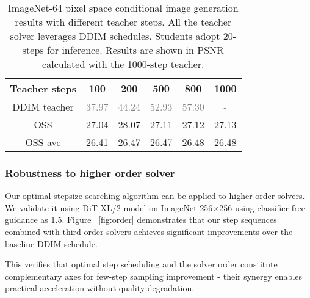\documentclass[10pt,twocolumn,letterpaper]{article}
\begin{document}
\begin{table}[htbp]

\centering
\begin{tabular}{cccccc} 
\toprule
Teacher steps                                & \textcolor[rgb]{0.2,0.2,0.2}{100}   & \textcolor[rgb]{0.2,0.2,0.2}{200}   & \textcolor[rgb]{0.2,0.2,0.2}{500}   & \textcolor[rgb]{0.2,0.2,0.2}{800}   & \textcolor[rgb]{0.2,0.2,0.2}{1000}   \\ 
\hline
\textcolor[rgb]{0.2,0.2,0.2}{DDIM teacher} & \textcolor{gray}{37.97} & \textcolor{gray}{44.24} & \textcolor{gray}{52.93} & \textcolor{gray}{57.30} & \textcolor{gray}{-}      \\
\hline
\textcolor[rgb]{0.2,0.2,0.2}{OSS} & \textcolor[rgb]{0.2,0.2,0.2}{27.04} & \textcolor[rgb]{0.2,0.2,0.2}{28.07} & \textcolor[rgb]{0.2,0.2,0.2}{27.11} & \textcolor[rgb]{0.2,0.2,0.2}{27.12} & \textcolor[rgb]{0.2,0.2,0.2}{27.13}  \\
\textcolor[rgb]{0.2,0.2,0.2}{OSS-ave}  & \textcolor[rgb]{0.2,0.2,0.2}{26.41} & \textcolor[rgb]{0.2,0.2,0.2}{26.47} & \textcolor[rgb]{0.2,0.2,0.2}{26.47} & \textcolor[rgb]{0.2,0.2,0.2}{26.48} & \textcolor[rgb]{0.2,0.2,0.2}{26.48}  \\
\bottomrule
\end{tabular}

\caption{ImageNet-64 pixel space conditional image generation results with different teacher steps. All the teacher solver leverages DDIM schedules. Students adopt 20-steps for inference. Results are shown in PSNR calculated with the 1000-step teacher.}
\label{table:diff_tea}
\end{table}




    \subsubsection{Robustness to higher order solver} \label{sec:teacher_order}

    
    Our optimal stepsize searching algorithm can be applied to higher-order solvers. We validate it using DiT-XL/2 model\cite{dit} on ImageNet 256×256 using classifier-free guidance as 1.5. Figure ~\ref{fig:order} demonstrates that our step sequences combined with third-order solvers achieves significant improvements over the baseline DDIM schedule.

    This verifies that optimal step scheduling and the solver order constitute complementary axes for few-step sampling improvement - their synergy enables practical acceleration without quality degradation.
    
\end{document}
